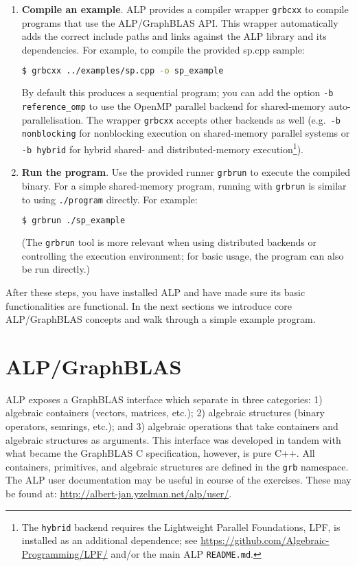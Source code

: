 \begin{enumerate}
\item \textbf{Compile an example}. ALP provides a compiler wrapper \texttt{grbcxx} to compile programs that use the ALP/GraphBLAS API. This wrapper automatically adds the correct include paths and links against the ALP library and its dependencies. For example, to compile the provided sp.cpp sample:
\begin{lstlisting}[language=bash]
$ grbcxx ../examples/sp.cpp -o sp_example
\end{lstlisting}
By default this produces a sequential program; you can add the option \texttt{-b reference\_omp} to use the OpenMP parallel backend for shared-memory auto-parallelisation. The wrapper \texttt{grbcxx} accepts other backends as well (e.g.\ \texttt{-b nonblocking} for nonblocking execution on shared-memory parallel systems or \texttt{-b hybrid} for hybrid shared- and distributed-memory execution\footnote{The \texttt{hybrid} backend requires the Lightweight Parallel Foundations, LPF, is installed as an additional dependence; see \url{https://github.com/Algebraic-Programming/LPF/} and/or the main ALP \texttt{README.md}.}).

\item \textbf{Run the program}. Use the provided runner \texttt{grbrun} to execute the compiled binary. For a simple shared-memory program, running with \texttt{grbrun} is similar to using \texttt{./program} directly. For example:
\begin{lstlisting}[language=bash]
$ grbrun ./sp_example
\end{lstlisting}
(The \texttt{grbrun} tool is more relevant when using distributed backends or controlling the execution environment; for basic usage, the program can also be run directly.)
\end{enumerate}
After these steps, you have installed ALP and have made sure its basic functionalities are functional. In the next sections we introduce core ALP/GraphBLAS concepts and walk through a simple example program.

\section{ALP/GraphBLAS}\label{sec:alp_concepts}

ALP exposes a GraphBLAS interface which separate in three categories: 1) algebraic containers (vectors, matrices, etc.); 2) algebraic structures (binary operators, semrings, etc.); and 3) algebraic operations that take containers and algebraic structures as arguments. This interface was developed in tandem with what became the GraphBLAS C specification, however, is pure C++. All containers, primitives, and algebraic structures are defined in the \texttt{grb} namespace. The ALP user documentation may be useful in course of the exercises. These may be found at: \url{http://albert-jan.yzelman.net/alp/user/}.

